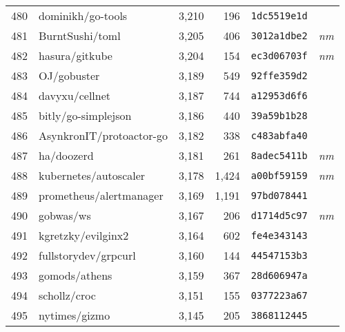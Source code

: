 {\begin{supertabular}{llrrll}
        480 &                  dominikh/go-tools &  3,210 &    196 &  \texttt{1dc5519e1d} &              \\
        481 &                    BurntSushi/toml &  3,205 &    406 &  \texttt{3012a1dbe2} &  \textit{nm} \\
        482 &                     hasura/gitkube &  3,204 &    154 &  \texttt{ec3d06703f} &  \textit{nm} \\
        483 &                        OJ/gobuster &  3,189 &    549 &  \texttt{92ffe359d2} &              \\
        484 &                     davyxu/cellnet &  3,187 &    744 &  \texttt{a12953d6f6} &              \\
        485 &                bitly/go-simplejson &  3,186 &    440 &  \texttt{39a59b1b28} &              \\
        486 &           AsynkronIT/protoactor-go &  3,182 &    338 &  \texttt{c483abfa40} &              \\
        487 &                         ha/doozerd &  3,181 &    261 &  \texttt{8adec5411b} &  \textit{nm} \\
        488 &              kubernetes/autoscaler &  3,178 &  1,424 &  \texttt{a00bf59159} &  \textit{nm} \\
        489 &            prometheus/alertmanager &  3,169 &  1,191 &  \texttt{97bd078441} &              \\
        490 &                          gobwas/ws &  3,167 &    206 &  \texttt{d1714d5c97} &  \textit{nm} \\
        491 &                 kgretzky/evilginx2 &  3,164 &    602 &  \texttt{fe4e343143} &              \\
        492 &               fullstorydev/grpcurl &  3,160 &    144 &  \texttt{44547153b3} &              \\
        493 &                      gomods/athens &  3,159 &    367 &  \texttt{28d606947a} &              \\
        494 &                       schollz/croc &  3,151 &    155 &  \texttt{0377223a67} &              \\
        495 &                      nytimes/gizmo &  3,145 &    205 &  \texttt{3868112445} &              \\

\end{supertabular}}
